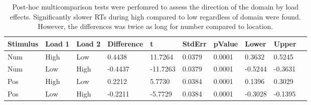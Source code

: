 \begin{table}
\centering
\begin{tabular}[0.2em]{@{}llllllllll@{}}\toprule
Stimulus & Load 1 & Load 2 & Difference & t & StdErr & pValue & Lower & Upper\\\toprule[0.2em]
Num & High & Low & 0.4438 & 11.7264 & 0.0379 & 0.0001 & 0.3632 & 0.5245 \\\midrule
Num & Low & High & -0.4437 & -11.7263 & 0.0379 & 0.0001 & -0.5244 & -0.3631 \\\midrule
Pos & High & Low & 0.2212 & 5.7730 & 0.0384 & 0.0001 & 0.1396 & 0.3029 \\\midrule
Pos & Low & High & -0.2211 & -5.7729 & 0.0384 & 0.0001 & -0.3028 & -0.1395 \\\bottomrule[0.2em]
\end{tabular}
\caption{Post-hoc multicomparison tests were perfomred to assess the direction of the domain by load effects. Significantly slower RTs during high compared to low regardless of domain were found. However, the differences was twice as long for number compared to location.\label{tabel:behStudy2RTphloadbydomain}}
\end{table}
